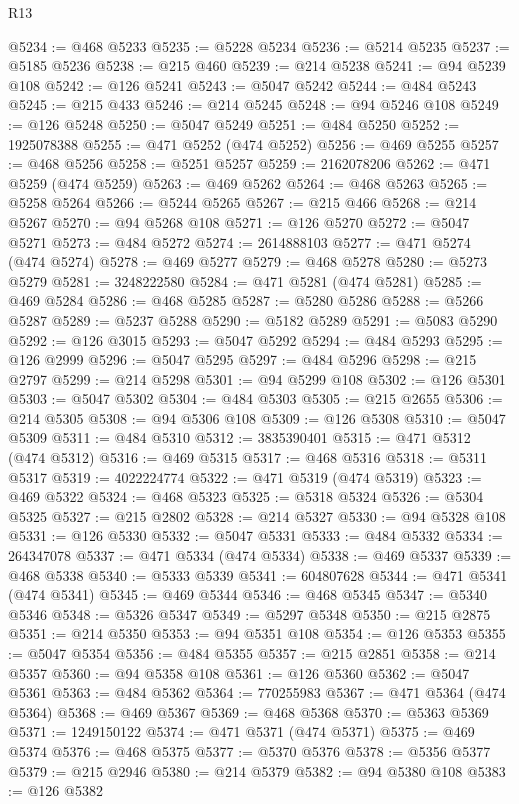 \begin{lexlean}{R13}
\begin{coremodule}
@5234 := @468 @5233
@5235 := @5228 @5234
@5236 := @5214 @5235
@5237 := @5185 @5236
@5238 := @215 @460
@5239 := @214 @5238
@5241 := @94 @5239 @108
@5242 := @126 @5241
@5243 := @5047 @5242
@5244 := @484 @5243
@5245 := @215 @433
@5246 := @214 @5245
@5248 := @94 @5246 @108
@5249 := @126 @5248
@5250 := @5047 @5249
@5251 := @484 @5250
@5252 := 1925078388
@5255 := @471 @5252 (@474 @5252)
@5256 := @469 @5255
@5257 := @468 @5256
@5258 := @5251 @5257
@5259 := 2162078206
@5262 := @471 @5259 (@474 @5259)
@5263 := @469 @5262
@5264 := @468 @5263
@5265 := @5258 @5264
@5266 := @5244 @5265
@5267 := @215 @466
@5268 := @214 @5267
@5270 := @94 @5268 @108
@5271 := @126 @5270
@5272 := @5047 @5271
@5273 := @484 @5272
@5274 := 2614888103
@5277 := @471 @5274 (@474 @5274)
@5278 := @469 @5277
@5279 := @468 @5278
@5280 := @5273 @5279
@5281 := 3248222580
@5284 := @471 @5281 (@474 @5281)
@5285 := @469 @5284
@5286 := @468 @5285
@5287 := @5280 @5286
@5288 := @5266 @5287
@5289 := @5237 @5288
@5290 := @5182 @5289
@5291 := @5083 @5290
@5292 := @126 @3015
@5293 := @5047 @5292
@5294 := @484 @5293
@5295 := @126 @2999
@5296 := @5047 @5295
@5297 := @484 @5296
@5298 := @215 @2797
@5299 := @214 @5298
@5301 := @94 @5299 @108
@5302 := @126 @5301
@5303 := @5047 @5302
@5304 := @484 @5303
@5305 := @215 @2655
@5306 := @214 @5305
@5308 := @94 @5306 @108
@5309 := @126 @5308
@5310 := @5047 @5309
@5311 := @484 @5310
@5312 := 3835390401
@5315 := @471 @5312 (@474 @5312)
@5316 := @469 @5315
@5317 := @468 @5316
@5318 := @5311 @5317
@5319 := 4022224774
@5322 := @471 @5319 (@474 @5319)
@5323 := @469 @5322
@5324 := @468 @5323
@5325 := @5318 @5324
@5326 := @5304 @5325
@5327 := @215 @2802
@5328 := @214 @5327
@5330 := @94 @5328 @108
@5331 := @126 @5330
@5332 := @5047 @5331
@5333 := @484 @5332
@5334 := 264347078
@5337 := @471 @5334 (@474 @5334)
@5338 := @469 @5337
@5339 := @468 @5338
@5340 := @5333 @5339
@5341 := 604807628
@5344 := @471 @5341 (@474 @5341)
@5345 := @469 @5344
@5346 := @468 @5345
@5347 := @5340 @5346
@5348 := @5326 @5347
@5349 := @5297 @5348
@5350 := @215 @2875
@5351 := @214 @5350
@5353 := @94 @5351 @108
@5354 := @126 @5353
@5355 := @5047 @5354
@5356 := @484 @5355
@5357 := @215 @2851
@5358 := @214 @5357
@5360 := @94 @5358 @108
@5361 := @126 @5360
@5362 := @5047 @5361
@5363 := @484 @5362
@5364 := 770255983
@5367 := @471 @5364 (@474 @5364)
@5368 := @469 @5367
@5369 := @468 @5368
@5370 := @5363 @5369
@5371 := 1249150122
@5374 := @471 @5371 (@474 @5371)
@5375 := @469 @5374
@5376 := @468 @5375
@5377 := @5370 @5376
@5378 := @5356 @5377
@5379 := @215 @2946
@5380 := @214 @5379
@5382 := @94 @5380 @108
@5383 := @126 @5382

\end{coremodule}
\end{lexlean}
